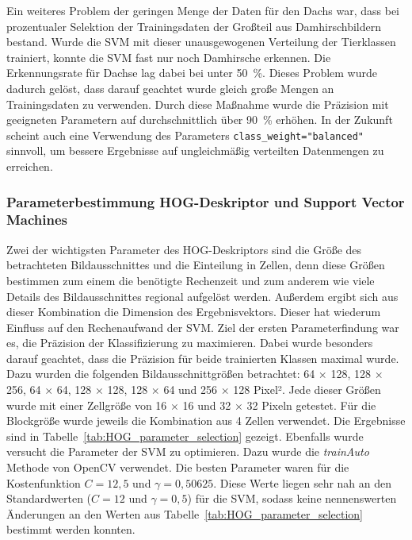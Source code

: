 Ein weiteres Problem der geringen Menge der Daten für den Dachs war, dass bei prozentualer Selektion der Trainingsdaten der Großteil aus Damhirschbildern bestand. Wurde die SVM mit dieser unausgewogenen Verteilung der Tierklassen trainiert, konnte die SVM fast nur noch Damhirsche erkennen. Die Erkennungsrate für Dachse lag dabei bei unter 50~\%. Dieses Problem wurde dadurch gelöst, dass darauf geachtet wurde gleich große Mengen an Trainingsdaten zu verwenden. Durch diese Maßnahme wurde die Präzision mit geeigneten Parametern auf durchschnittlich über 90~\% erhöhen. In der Zukunft scheint auch eine Verwendung des Parameters \texttt{class\_weight="balanced"} sinnvoll, um bessere Ergebnisse auf ungleichmäßig verteilten Datenmengen zu erreichen.

\subsubsection{Parameterbestimmung HOG-Deskriptor und Support Vector Machines} \label{sssec:HOG:parmeter}
Zwei der wichtigsten Parameter des HOG-Deskriptors sind die Größe des betrachteten Bildausschnittes und die Einteilung in Zellen, denn diese Größen bestimmen zum einem die benötigte Rechenzeit und zum anderem wie viele Details des Bildausschnittes regional aufgelöst werden. Außerdem ergibt sich aus dieser Kombination die Dimension des Ergebnisvektors. Dieser hat wiederum Einfluss auf den Rechenaufwand der SVM. Ziel der ersten Parameterfindung war es, die Präzision der Klassifizierung zu maximieren. Dabei wurde besonders darauf geachtet, dass die Präzision für beide trainierten Klassen maximal wurde. Dazu wurden die folgenden Bildausschnittgrößen betrachtet: 64 $\times$ 128, 128  $\times$ 256, 64 $\times$ 64, 128 $\times$ 128, 128 $\times$ 64 und 256 $\times$ 128 Pixel². Jede dieser Größen wurde mit einer Zellgröße von 16 $\times$ 16 und 32 $\times$ 32 Pixeln getestet. Für die Blockgröße wurde jeweils die Kombination aus 4 Zellen verwendet. Die Ergebnisse sind in Tabelle~\ref{tab:HOG_parameter_selection} gezeigt.  
Ebenfalls wurde versucht die Parameter der SVM zu optimieren. Dazu wurde die \textit{trainAuto} Methode von OpenCV verwendet. Die besten Parameter waren für die Kostenfunktion $C=12,5$ und $\gamma=0,50625$. Diese Werte liegen sehr nah an den Standardwerten ($C=12$ und $\gamma=0,5$) für die SVM, sodass keine nennenswerten Änderungen an den Werten aus Tabelle~\ref{tab:HOG_parameter_selection} bestimmt werden konnten.

